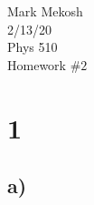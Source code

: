 \documentclass{article}
\newcommand{\homework}[3]{\flushleft Mark Mekosh \\ #1 \\ #2 \\ #3}
\begin{document}
\homework{2/13/20}{Phys 510}{Homework $\#2$}

\section*{1}

	\subsection*{a)}
\end{document}
